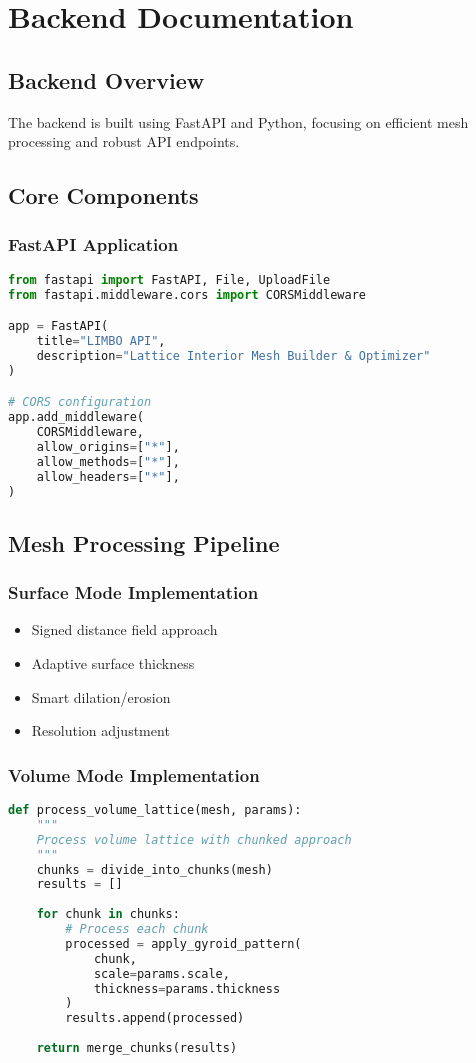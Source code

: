 \chapter{Backend Documentation}

\section{Backend Overview}
The backend is built using FastAPI and Python, focusing on efficient mesh processing and robust API endpoints.

\section{Core Components}
\subsection{FastAPI Application}
\begin{lstlisting}[language=Python]
from fastapi import FastAPI, File, UploadFile
from fastapi.middleware.cors import CORSMiddleware

app = FastAPI(
    title="LIMBO API",
    description="Lattice Interior Mesh Builder & Optimizer"
)

# CORS configuration
app.add_middleware(
    CORSMiddleware,
    allow_origins=["*"],
    allow_methods=["*"],
    allow_headers=["*"],
)
\end{lstlisting}

\section{Mesh Processing Pipeline}
\subsection{Surface Mode Implementation}
\begin{itemize}
    \item Signed distance field approach
    \item Adaptive surface thickness
    \item Smart dilation/erosion
    \item Resolution adjustment
\end{itemize}

\subsection{Volume Mode Implementation}
\begin{lstlisting}[language=Python]
def process_volume_lattice(mesh, params):
    """
    Process volume lattice with chunked approach
    """
    chunks = divide_into_chunks(mesh)
    results = []
    
    for chunk in chunks:
        # Process each chunk
        processed = apply_gyroid_pattern(
            chunk,
            scale=params.scale,
            thickness=params.thickness
        )
        results.append(processed)
    
    return merge_chunks(results)
\end{lstlisting}

